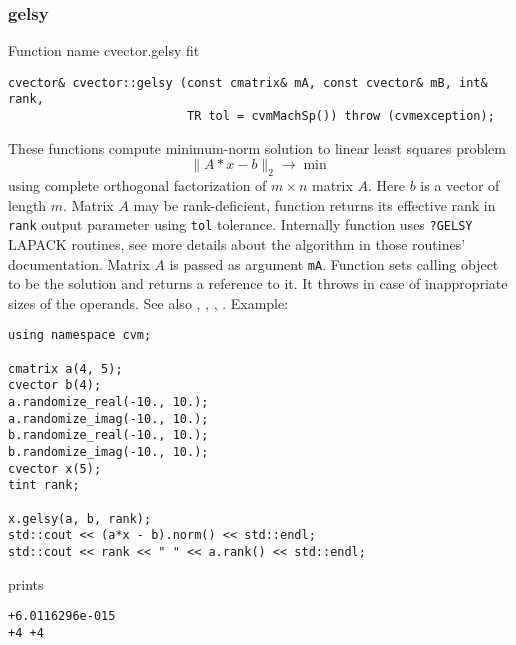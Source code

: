 \subsubsection{gelsy}
Function%
\pdfdest name {cvector.gelsy} fit
\begin{verbatim}
cvector& cvector::gelsy (const cmatrix& mA, const cvector& mB, int& rank,
                         TR tol = cvmMachSp()) throw (cvmexception);
\end{verbatim}
These functions 
compute minimum-norm solution to  linear
least squares problem 
\begin{equation*}
\|A*x-b\|_2\to\min
\end{equation*}
using  complete orthogonal factorization of $m\times n$ matrix $A$.
Here $b$ is a vector of length $m$.
Matrix $A$ may be rank-deficient, function returns its effective rank in \verb"rank"
output parameter using \verb"tol" tolerance.
Internally  function uses \verb"?GELSY" LAPACK routines, see more details
about the algorithm in those routines' documentation.
Matrix $A$ is passed as  argument \verb"mA".
Function sets calling object to be the solution and returns a reference to it.
It throws
in case of inappropriate sizes of the operands.
See also , 
, , 
.
Example:
\begin{Verbatim}
using namespace cvm;

cmatrix a(4, 5);
cvector b(4);
a.randomize_real(-10., 10.);
a.randomize_imag(-10., 10.);
b.randomize_real(-10., 10.);
b.randomize_imag(-10., 10.);
cvector x(5);
tint rank;

x.gelsy(a, b, rank);
std::cout << (a*x - b).norm() << std::endl;
std::cout << rank << " " << a.rank() << std::endl;
\end{Verbatim}
prints
\begin{Verbatim}
+6.0116296e-015
+4 +4
\end{Verbatim}
\newpage



